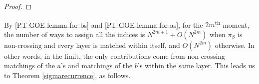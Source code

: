 \documentclass[11pt,reqno]{amsart}
\numberwithin{equation}{section}
\theoremstyle{plain}
\begin{document}
\begin{proof}
\end{proof}

By \eqref{PT-GOE lemma for bs} and \eqref{PT-GOE lemma for as}, for the $2m$\textsuperscript{th} moment, the number of ways to assign all the indices is $N^{2m+1}+O(N^{2m})$ when $\pi_S$ is non-crossing and every layer is matched within itself, and $O(N^{2m})$ otherwise. In other words, in the limit, the only contributions come from non-crossing matchings of the $a$'s and matchings of the $b$'s within the same layer. This leads us to Theorem \ref{sigmarecurrence}, as follows.
\end{document}
